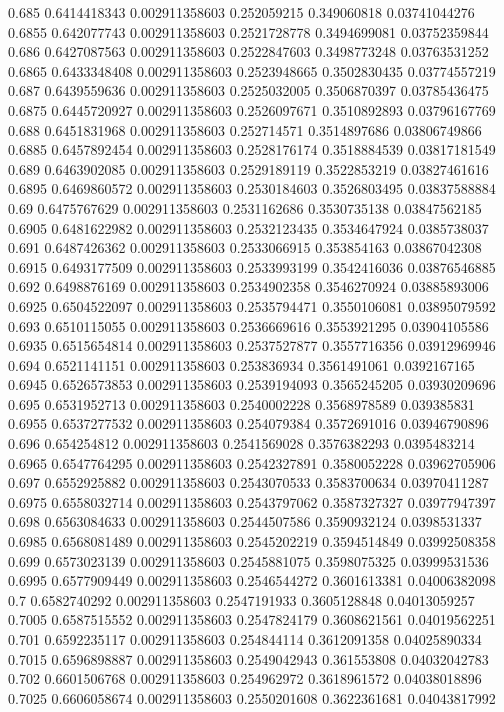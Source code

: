 {0.685 0.6414418343 0.002911358603 0.252059215 0.349060818 0.03741044276
0.6855 0.642077743 0.002911358603 0.2521728778 0.3494699081 0.03752359844
0.686 0.6427087563 0.002911358603 0.2522847603 0.3498773248 0.03763531252
0.6865 0.6433348408 0.002911358603 0.2523948665 0.3502830435 0.03774557219
0.687 0.6439559636 0.002911358603 0.2525032005 0.3506870397 0.03785436475
0.6875 0.6445720927 0.002911358603 0.2526097671 0.3510892893 0.03796167769
0.688 0.6451831968 0.002911358603 0.252714571 0.3514897686 0.03806749866
0.6885 0.6457892454 0.002911358603 0.2528176174 0.3518884539 0.03817181549
0.689 0.6463902085 0.002911358603 0.2529189119 0.3522853219 0.03827461616
0.6895 0.6469860572 0.002911358603 0.2530184603 0.3526803495 0.03837588884
0.69 0.6475767629 0.002911358603 0.2531162686 0.3530735138 0.03847562185
0.6905 0.6481622982 0.002911358603 0.2532123435 0.3534647924 0.0385738037
0.691 0.6487426362 0.002911358603 0.2533066915 0.353854163 0.03867042308
0.6915 0.6493177509 0.002911358603 0.2533993199 0.3542416036 0.03876546885
0.692 0.6498876169 0.002911358603 0.2534902358 0.3546270924 0.03885893006
0.6925 0.6504522097 0.002911358603 0.2535794471 0.3550106081 0.03895079592
0.693 0.6510115055 0.002911358603 0.2536669616 0.3553921295 0.03904105586
0.6935 0.6515654814 0.002911358603 0.2537527877 0.3557716356 0.03912969946
0.694 0.6521141151 0.002911358603 0.253836934 0.3561491061 0.0392167165
0.6945 0.6526573853 0.002911358603 0.2539194093 0.3565245205 0.03930209696
0.695 0.6531952713 0.002911358603 0.2540002228 0.3568978589 0.039385831
0.6955 0.6537277532 0.002911358603 0.254079384 0.3572691016 0.03946790896
0.696 0.654254812 0.002911358603 0.2541569028 0.3576382293 0.0395483214
0.6965 0.6547764295 0.002911358603 0.2542327891 0.3580052228 0.03962705906
0.697 0.6552925882 0.002911358603 0.2543070533 0.3583700634 0.03970411287
0.6975 0.6558032714 0.002911358603 0.2543797062 0.3587327327 0.03977947397
0.698 0.6563084633 0.002911358603 0.2544507586 0.3590932124 0.0398531337
0.6985 0.6568081489 0.002911358603 0.2545202219 0.3594514849 0.03992508358
0.699 0.6573023139 0.002911358603 0.2545881075 0.3598075325 0.03999531536
0.6995 0.6577909449 0.002911358603 0.2546544272 0.3601613381 0.04006382098
0.7 0.6582740292 0.002911358603 0.2547191933 0.3605128848 0.04013059257
0.7005 0.6587515552 0.002911358603 0.2547824179 0.3608621561 0.04019562251
0.701 0.6592235117 0.002911358603 0.254844114 0.3612091358 0.04025890334
0.7015 0.6596898887 0.002911358603 0.2549042943 0.361553808 0.04032042783
0.702 0.6601506768 0.002911358603 0.254962972 0.3618961572 0.04038018896
0.7025 0.6606058674 0.002911358603 0.2550201608 0.3622361681 0.04043817992
}
